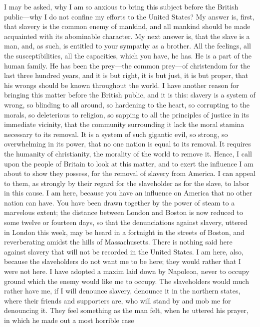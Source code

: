 I may be asked, why I am so anxious to bring this subject before the
British public---why I do not confine my efforts to the United States?
My answer is, first, that slavery is the common enemy of mankind, and
all mankind should be made acquainted with its abominable character. My
next answer is, that the slave is a man, and, as such, is entitled to
your sympathy as a brother. All the feelings, all the susceptibilities,
all the capacities, which you have, he has. He is a part of the human
family. He has been the prey---the common prey---of christendom for the
last three hundred years, and it is but right, it is but just, it is but
proper, that his wrongs should be known throughout the world. I have
another reason for bringing this matter before the British public, and
it is this: slavery is a system of wrong, so blinding to all around, so
hardening to the heart, so corrupting to the morals, so deleterious to
religion, so sapping to all the principles of justice in its immediate
vicinity, that the community surrounding it lack the moral {}stamina
necessary to its removal. It is a system of such gigantic evil, so
strong, so overwhelming in its power, that no one nation is equal to its
removal. It requires the humanity of christianity, the morality of the
world to remove it. Hence, I call upon the people of Britain to look at
this matter, and to exert the influence I am about to show they possess,
for the removal of slavery from America. I can appeal to them, as
strongly by their regard for the slaveholder as for the slave, to labor
in this cause. I am here, because you have an influence on America that
no other nation can have. You have been drawn together by the power of
steam to a marvelous extent; the distance between London and Boston is
now reduced to some twelve or fourteen days, so that the denunciations
against slavery, uttered in London this week, may be heard in a
fortnight in the streets of Boston, and reverberating amidst the hills
of Massachusetts. There is nothing said here against slavery that will
not be recorded in the United States. I am here, also, because the
slaveholders do not want me to be here; they would rather that I were
not here. I have adopted a maxim laid down by Napoleon, never to occupy
ground which the enemy would like me to occupy. The slaveholders would
much rather have me, if I will denounce slavery, denounce it in the
northern states, where their friends and supporters are, who will stand
by and mob me for denouncing it. They feel something as the man felt,
when he uttered his prayer, in which he made out a most horrible case
